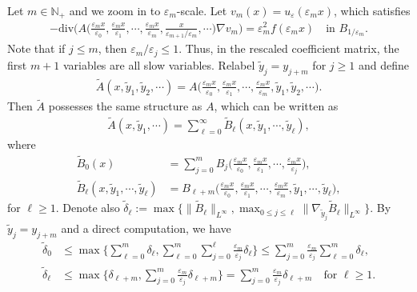 \documentclass[reqno,12pt]{amsart} %
\theoremstyle{definition}
\theoremstyle{remark}
\numberwithin{equation}{section}
\newcommand{\e}{\varepsilon}
\begin{document}
Let $m\in \mathbb{N}_+$ and we zoom in to $\e_m$-scale. Let $v_m(x) = u_\e(\varepsilon_m x)$, which satisfies
\begin{align*}
  -\mathrm{div}\Big(A\Big(\frac{\varepsilon_mx}{\varepsilon_0}, \frac{\varepsilon_m x}{\varepsilon_1},\cdots, \frac{\varepsilon_mx}{\varepsilon_m}, \frac{x}{\varepsilon_{m+1}/\varepsilon_{m}}, \cdots\Big)\nabla v_m\Big)=\varepsilon_m^2f(\varepsilon_m x)\quad \text{in }B_{1/\varepsilon_m}.
\end{align*}
Note that if $j\le m$, then $\e_m/\e_j \le 1$. Thus, in the rescaled coefficient matrix, the first $m+1$ variables are all slow variables. 
Relabel $\widetilde{y}_j = y_{j+m}$ for $j\geq 1$ and define 
\begin{align*}
  \widetilde{A}(x, \widetilde{y}_{1}, \widetilde{y}_2, \cdots)=A\Big(\frac{\varepsilon_mx}{\varepsilon_0}, \frac{\varepsilon_m x}{\varepsilon_1},\cdots, \frac{\varepsilon_mx}{\varepsilon_m}, \widetilde{y}_1, \widetilde{y}_2, \cdots \Big).
\end{align*}
Then $\widetilde{A}$ possesses the same structure as $A$, which can be written as
\begin{align*}
  \widetilde{A}(x, \widetilde{y}_{1}, \cdots)=\sum_{\ell=0}^\infty\widetilde{B}_\ell(x, \widetilde{y}_{1}, \cdots, \widetilde{y}_{\ell}),
\end{align*}
where
\begin{align*}
  \widetilde{B}_0(x)&=\sum_{j=0}^m B_j \Big(\frac{\varepsilon_mx}{\varepsilon_0}, \frac{\varepsilon_m x}{\varepsilon_1},\cdots, \frac{\varepsilon_mx}{\varepsilon_j} \Big),\\ 
  \widetilde{B}_\ell(x, \widetilde{y}_1, \cdots, \widetilde{y}_\ell)&=B_{\ell+m} \Big( \frac{\varepsilon_mx}{\varepsilon_0}, \frac{\varepsilon_m x}{\varepsilon_1},\cdots, \frac{\varepsilon_mx}{\varepsilon_m}, \widetilde{y}_1, \cdots, \widetilde{y}_{\ell} \Big),
\end{align*}
for $\ell\geq 1$. Denote also $\widetilde{\delta}_\ell:=\max\{\|\widetilde{B}_\ell\|_{L^\infty}, \max_{0\leq j\le \ell}\|\nabla_{\widetilde{y}_j}\widetilde{B}_\ell\|_{L^\infty}\}$. By $\widetilde{y}_j = y_{j+m}$ and a direct computation, we have
\begin{align*}
  \widetilde{\delta}_0&\leq \max\bigg\{\sum_{\ell=0}^m\delta_\ell, \sum_{\ell=0}^m\sum_{j=0}^{\ell}\frac{\varepsilon_m}{\varepsilon_j}\delta_\ell\bigg\}\le \sum_{j=0}^m\frac{\varepsilon_m}{\varepsilon_j}\sum_{\ell=0}^m\delta_\ell,\\
  \widetilde{\delta}_{\ell}&\leq \max\bigg\{\delta_{\ell+m}, \sum_{j=0}^{m}\frac{\varepsilon_m}{\varepsilon_j}\delta_{\ell+m}\bigg\}=\sum_{j=0}^m\frac{\varepsilon_m}{\varepsilon_j}\delta_{\ell+m}\quad \text{for }\ell\geq 1.
\end{align*}
\end{document}
